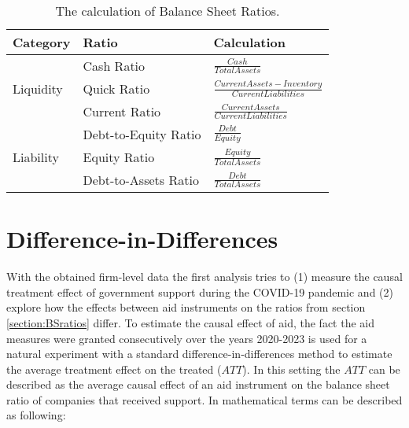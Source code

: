 \begin{table}%
    \caption{The calculation of Balance Sheet Ratios.}
    \label{tab:RatioCalc}
    \centering
    \def\arraystretch{1.5}
    \begin{tabular}{@{}lll@{}}
    \toprule
    Category                   & Ratio                & Calculation \\ \midrule
    \multirow{3}{*}{Liquidity} & Cash Ratio           & $\frac{Cash}{Total Assets}$ \\ %
                                & Quick Ratio          & $\frac{Current Assets-Inventory}{Current Liabilities}$ \\ %
                                & Current Ratio        & $\frac{Current Assets}{Current Liabilities}$ \\ \midrule
    \multirow{3}{*}{Liability} & Debt-to-Equity Ratio & $\frac{Debt}{Equity}$ \\ %
                                & Equity Ratio         & $\frac{Equity}{Total Assets}$ \\ %
                                & Debt-to-Assets Ratio & $\frac{Debt}{Total Assets}$ \\ \bottomrule
    \end{tabular}
\end{table}









\section{Difference-in-Differences}

With the obtained firm-level data the first analysis tries to (1) measure the causal treatment effect of government support during the COVID-19 pandemic and (2) explore how the effects between aid instruments on the ratios from section \ref{section:BSratios} differ. To estimate the causal effect of aid, the fact the aid measures were granted consecutively over the years 2020-2023 is used for a natural experiment with a standard difference-in-differences method to estimate the average treatment effect on the treated ($ATT$). In this setting the $ATT$ can be described as the average causal effect of an aid instrument on the balance sheet ratio of companies that received support. In mathematical terms can be described as following:

